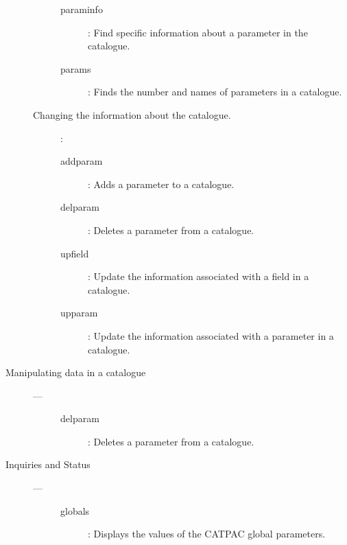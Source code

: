 \begin{description}
\begin{description}
\begin {description}
\item [paraminfo]:
 Find specific information about a parameter in the catalogue.

\item [params]:
 Finds the number and names of parameters in a catalogue.

\end{description}

\item [Changing the information about the catalogue.] :

\begin{description}

\item [addparam]:
 Adds a parameter to a catalogue.

\item [delparam]:
 Deletes a parameter from a catalogue.

\item [upfield]:
 Update the information associated with a field in a catalogue.

\item [upparam]:
 Update the information associated with a parameter in a catalogue.

\end{description}

\end{description}

\item [Manipulating data in a catalogue] ---

\begin{description}

\item[\mbox{}]\mbox{}
\begin{description}

\item [delparam]:
 Deletes a parameter from a catalogue.

\end{description}

\end{description}

\item [Inquiries and Status] ---

\begin{description}

\item[\mbox{}]\mbox{}
\begin{description}

\item [globals]:
 Displays the values of the CATPAC global parameters.

\end{description}

\end{description}

\end{description}

